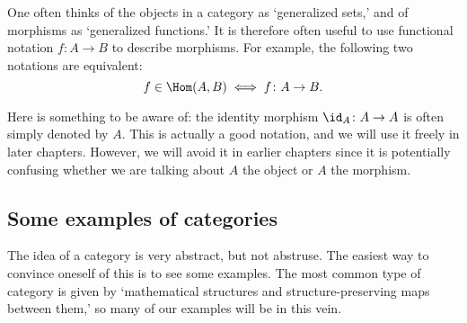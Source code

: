 \documentclass[notes.tex]{subfiles}
\begin{document}
One often thinks of the objects in a category as `generalized sets,' and of morphisms as `generalized functions.' It is therefore often useful to use functional notation $f\colon A \to B$ to describe morphisms. For example, the following two notations are equivalent:
\begin{equation*}
  f \in \Hom(A, B) \iff f\colon A \to B.
\end{equation*}

Here is something to be aware of: the identity morphism $\id_{A}\colon A \to A$ is often simply denoted by $A$. This is actually a good notation, and we will use it freely in later chapters. However, we will avoid it in earlier chapters since it is potentially confusing whether we are talking about $A$ the object or $A$ the morphism.


\subsection{Some examples of categories}\label{sse:examples_of_categories}

The idea of a category is very abstract, but not abstruse. The easiest way to convince oneself of this is to see some examples. The most common type of category is given by `mathematical structures and structure-preserving maps between them,' so many of our examples will be in this vein.
\end{document}
